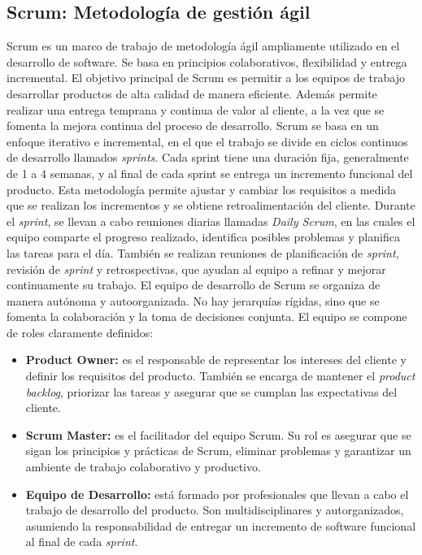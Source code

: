     \subsection{Scrum: Metodología de gestión ágil}
    Scrum \cite{wiki:scrum} es un marco de trabajo de metodología ágil ampliamente utilizado en el desarrollo de software. Se basa en principios colaborativos, flexibilidad y entrega incremental. El objetivo principal de Scrum es permitir a los equipos de trabajo desarrollar productos de alta calidad de manera eficiente. Además permite realizar una entrega temprana y continua de valor al cliente, a la vez que se fomenta la mejora continua del proceso de desarrollo.
    Scrum se basa en un enfoque iterativo e incremental, en el que el trabajo se divide en ciclos continuos de desarrollo llamados \textit{sprints}. Cada sprint tiene una duración fija, generalmente de 1 a 4 semanas, y al final de cada sprint se entrega un incremento funcional del producto. Esta metodología permite ajustar y cambiar los requisitos a medida que se realizan los incrementos y se obtiene retroalimentación del cliente.
    Durante el \textit{sprint}, se llevan a cabo reuniones diarias llamadas \textit{Daily Scrum}, en las cuales el equipo comparte el progreso realizado, identifica posibles problemas y planifica las tareas para el día. También se realizan reuniones de planificación de \textit{sprint}, revisión de \textit{sprint} y retrospectivas, que ayudan al equipo a refinar y mejorar continuamente su trabajo.
    El equipo de desarrollo de Scrum se organiza de manera autónoma y autoorganizada. No hay jerarquías rígidas, sino que se fomenta la colaboración y la toma de decisiones conjunta. El equipo se compone de roles claramente definidos:
    \begin{itemize}
      \item \textbf{Product Owner:} es el responsable de representar los intereses del cliente y definir los requisitos del producto. También se encarga de mantener el \textit{product backlog}, priorizar las tareas y asegurar que se cumplan las expectativas del cliente.
      \item \textbf{Scrum Master:} es el facilitador del equipo Scrum. Su rol es asegurar que se sigan los principios y prácticas de Scrum, eliminar problemas y garantizar un ambiente de trabajo colaborativo y productivo.
      \item \textbf{Equipo de Desarrollo:} está formado por profesionales que llevan a cabo el trabajo de desarrollo del producto. Son multidisciplinares y autorganizados, asumiendo la responsabilidad de entregar un incremento de software funcional al final de cada \textit{sprint}.
    \end{itemize}

